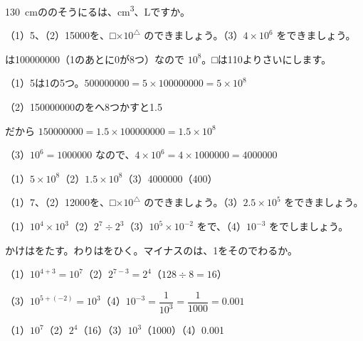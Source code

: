 \begin{jibun}
1\qty{30}{cm}ののそうにるは、\unit{cm^3}、Lですか。
\end{jibun}

\begin{reidai}[\R{大}{おお}きな\R{数}{かず}を10の\R{累乗}{るい|じょう}で]
（1）5、（2）15000を、□$\times10^{\text{△}}$ のできましょう。（3）$4\times10^6$ をできましょう。\par
{}は100000000（1のあとに0が8つ）なので $10^8$。□は110よりさいにします。\par
\shiki （1）5は1の5つ。$500000000=5\times100000000=5\times10^8$\par
\hspace*{2.6\zw}（2）150000000のをへ8つかすと1.5\par
\hspace*{2.6\zw}\phantom{（2）}だから $150000000=1.5\times100000000=1.5\times10^8$\par
\hspace*{2.6\zw}（3）$10^6=1000000$ なので、$4\times10^6=4\times1000000=4000000$\par
\kotae （1）$5\times10^8$\quad（2）$1.5\times10^8$\quad（3）4000000（400）
\end{reidai}

\begin{jibun}
（1）7、（2）12000を、□$\times10^{\text{△}}$ のできましょう。（3）$2.5\times10^5$ をできましょう。
\end{jibun}

\begin{reidai}[\R{指数}{し|すう}のきまりを\R{使}{つか}う]
（1）$10^4\times10^3$\quad（2）$2^7\div2^3$\quad（3）$10^5\times10^{-2}$ をで、（4）$10^{-3}$ をでしましょう。\par
\kangaekata かけはをたす。わりはをひく。マイナスのは、1をそのでわるか。\par
\shiki （1）$10^{4+3}=10^7$\qquad（2）$2^{7-3}=2^4$\quad（$128\div8=16$）\par
\hspace*{2.6\zw}（3）$10^{5+(-2)}=10^3$\qquad（4）$10^{-3}=\dfrac{1}{10^3}=\dfrac{1}{1000}=0.001$\par
\kotae （1）$10^7$\quad（2）$2^4$（16）\quad（3）$10^3$（1000）\quad（4）0.001
\end{reidai}

